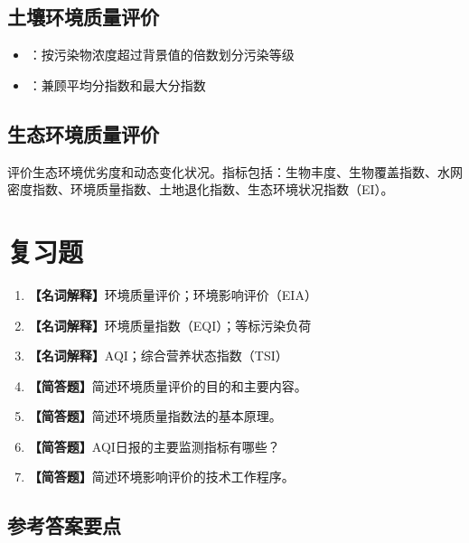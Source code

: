 \documentclass[10pt,a4paper,oneside]{ctexbook}
\begin{document}
\subsection{土壤环境质量评价}
\begin{itemize}[leftmargin=*]
    \item {}：按污染物浓度超过背景值的倍数划分污染等级
    \item {}：兼顾平均分指数和最大分指数
\end{itemize}

\subsection{生态环境质量评价}
评价生态环境优劣度和动态变化状况。指标包括：生物丰度、生物覆盖指数、水网密度指数、环境质量指数、土地退化指数、生态环境状况指数（EI）。

\section{复习题}

\begin{enumerate}[leftmargin=*, itemsep=8pt]
    \item \textbf{【名词解释】}环境质量评价；环境影响评价（EIA）
    \item \textbf{【名词解释】}环境质量指数（EQI）；等标污染负荷
    \item \textbf{【名词解释】}AQI；综合营养状态指数（TSI）
    \item \textbf{【简答题】}简述环境质量评价的目的和主要内容。
    \item \textbf{【简答题】}简述环境质量指数法的基本原理。
    \item \textbf{【简答题】}AQI日报的主要监测指标有哪些？
    \item \textbf{【简答题】}简述环境影响评价的技术工作程序。
\end{enumerate}

\subsection*{参考答案要点}
\end{document}
